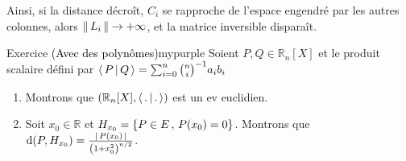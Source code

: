         Ainsi, si la distance décroît,  $C_i$ se rapproche de l’espace engendré par les autres colonnes, alors $\left\lVert \,L_i \, \right\rVert \to +\infty$, et la matrice inversible disparaît.

        \begin{omed}{Exercice \textcolor{black}{(Avec des polynômes)}}{mypurple}
            Soient $P,Q \in \mathbb{R}_n[X]$ et le produit scalaire défini par 
            $\left<\,P\,\middle|\,Q\,\right> = \sum_{i=0}^{n} \binom{n}{i}^{-1} a_i b_i$ 
            \begin{enumerate}
                \item Montrons que $(\mathbb{R}_n[X], \left<\,.\,\middle|\,.\,\right>)$ est un ev euclidien.
                \item Soit $x_0 \in \mathbb{R}$ et $H_{x_0} = \left\{ P \in E \, , \, P(x_0) = 0 \right\}$. Montrons que $\operatorname{d}(P,H_{x_0}) = \frac{\left\lvert \,P(x_0) \, \right\rvert}{\left(1 + x_0^2\right)^{n/2}}$.
            \end{enumerate}
        \end{omed}

